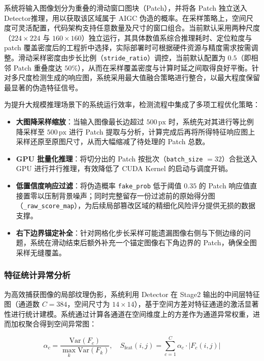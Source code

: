 \documentclass[UTF8, a4paper, 12pt]{ctexart}
\begin{document}
系统将输入图像划分为重叠的滑动窗口图块（Patch），并将各 Patch 独立送入Detector推理，用以获取该区域属于 AIGC 伪造的概率。在采样策略上，空间尺度可灵活配置，代码架构支持任意数量及尺寸的窗口组合。当前默认采用两种尺度（$224 \times 224$ 与 $160 \times 160$）独立运行，其具体数值系综合推理耗时、定位粒度与 patch 覆盖密度后的工程折中选择，实际部署时可根据硬件资源与精度需求按需调整。滑动采样密度由步长比例（\texttt{stride\_ratio}）调控，当前默认配置为 $0.5$（即相邻 Patch 重叠度达 $50\%$），从而在采样覆盖密度与计算时延之间取得良好平衡。针对多尺度检测生成的响应图，系统采用最大值融合策略进行整合，以最大程度保留最显著的伪造特征信号。

为提升大规模推理场景下的系统运行效率，检测流程中集成了多项工程优化策略：

\begin{itemize}
 \item \textbf{大图降采样缩放}：当输入图像最长边超过 $500\,\text{px}$ 时，系统先对其进行等比例降采样至 $500\,\text{px}$ 进行 Patch 提取与分析，计算完成后再将所得特征响应图上采样还原至原图尺寸，从而大幅缩减了待处理的 Patch 总数。
 \item \textbf{GPU 批量化推理}：将切分出的 Patch 按批次（\texttt{batch\_size} $= 32$）合批送入 GPU 进行并行推理，有效降低了 CUDA Kernel 的启动与调度开销。
 \item \textbf{低置信度响应过滤}：将伪造概率 \texttt{fake\_prob} 低于阈值 $0.35$ 的 Patch 响应值直接置零以压制背景噪声；同时完整留存一份过滤前的原始得分图（\texttt{\_raw\_score\_map}），为后续局部篡改区域的精细化风险评分提供无损的数据支撑。
 \item \textbf{右下边界锚定补全}：针对网格化步长采样可能遗漏图像右侧与下侧边缘的问题，系统在滑动结束后额外补充一个锚定图像右下角边界的 Patch，确保全图采样无缝覆盖。
\end{itemize}

\subsubsection{特征统计异常分析}

为高效捕获图像的局部纹理伪影，系统利用 Detector 在 Stage2 输出的中间层特征图（通道数 $C = 384$，空间尺寸为 $14 \times 14$），基于空间方差对特征通道的激活显著性进行统计建模。系统通过计算各通道在空间维度上的方差作为通道异常权重，进而加权聚合得到空间异常图：

\begin{equation}
\alpha_c = \frac{\text{Var}(F_c)}{\max_k \text{Var}(F_k)}, \quad S_{\text{feat}}(i,j) = \sum_{c=1}^{C} \alpha_c \cdot |F_c(i,j)|
\end{equation}
\end{document}
